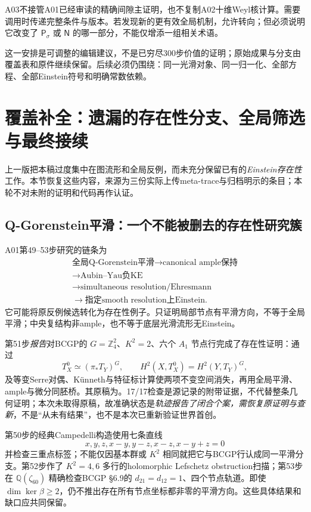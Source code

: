 \documentclass[UTF8,a4paper,11pt,fontset=fandol]{ctexart}
\numberwithin{equation}{section}
\theoremstyle{definition}
\newcommand{\Z}{\mathbb Z}
\begin{document}
A03不接管A01已经审读的精确间隙主证明，也不复制A02十维Weyl核计算。需要调用时传递完整条件与版本。若发现新的更有效全局机制，允许转向；但必须说明它改变了 $\mathsf P_\sigma$ 或 $\mathsf N$ 的哪一部分，不能仅增添一组相关术语。

这一安排是可调整的编辑建议，不是已穷尽300步价值的证明；原始成果与分支由覆盖表和原件继续保留。后续必须仍围绕：同一光滑对象、同一归一化、全部方程、全部Einstein符号和明确常数依赖。

\section{覆盖补全：遗漏的存在性分支、全局筛选与最终接续}\label{sec:restore-a03}
上一版把本稿过度集中在图流形和全局反例，而未充分保留已有的\emph{Einstein存在性}工作。本节恢复这些内容，来源为三份实际上传meta-trace与归档明示的条目；本轮不对未附的证明和代码再作认证。

\subsection{Q-Gorenstein平滑：一个不能被删去的存在性研究簇}
A01第49--53步研究的链条为
\[
\begin{gathered}
\text{全局Q-Gorenstein平滑}\longrightarrow\text{canonical ample保持}\\
\longrightarrow\text{Aubin--Yau负KE}\\
\longrightarrow\text{simultaneous resolution/Ehresmann}\\
\longrightarrow\text{指定smooth resolution上Einstein}.
\end{gathered}
\]
它可能将原反例候选转化为存在性例子。只证明局部节点有平滑方向，不等于全局平滑；中央复结构非ample，也不等于底层光滑流形无Einstein。

第51步\emph{报告}对BCGP的 $G=\Z_4^2$、$K^2=2$、六个 $A_1$ 节点行完成了存在性证明：通过
\[
T_X^0\simeq(\pi_*T_Y)^G,\qquad
H^2(X,T_X^0)=H^2(Y,T_Y)^G,
\]
及等变Serre对偶、K\"unneth与特征标计算使两项不变空间消失，再用全局平滑、ample与微分同胚桥。其原稿为。17/17检查是源记录的附带证据，不代替整条几何证明；本次未取得原稿，故准确状态是\emph{轨迹报告了闭合个案，需恢复原证明与查新}，不是“从未有结果”，也不是本次已重新验证世界首创。

第50步的经典Campedelli构造使用七条直线
\[
x,y,z,x-y,y-z,x-z,x-y+z=0
\]
并检查三重点标签；不能仅因基本群或 $K^2$ 相同就把它与BCGP行认成同一平滑分支。第52步作了 $K^2=4,6$ 多行的holomorphic Lefschetz obstruction扫描；第53步在 $\mathbb Q(\zeta_{60})$ 精确检查BCGP \S6.9的 $d_{21}=d_{12}=1$、四个节点轨道。即使 $\dim\ker\beta\ge2$，仍不推出存在所有节点坐标都非零的平滑方向。这些具体结果和缺口应共同保留。
\end{document}
